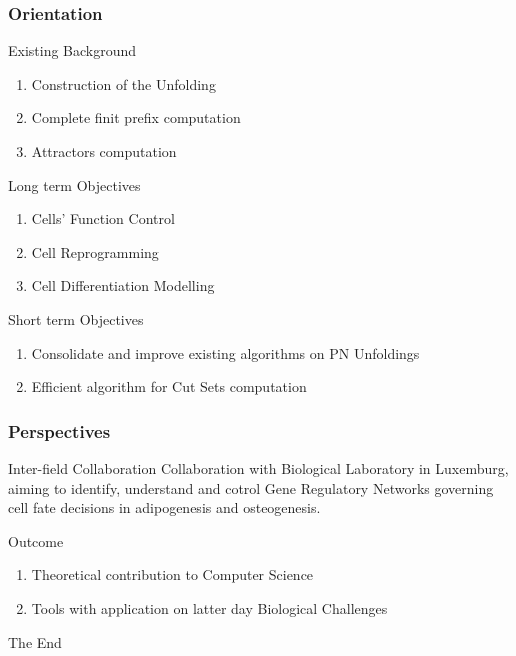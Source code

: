 \documentclass{beamer}
\begin{document}
\begin{frame}
\frametitle{Orientation}

\begin{block}{Existing Background}
\begin{enumerate}
\item Construction of the Unfolding
\item Complete finit prefix computation
\item Attractors computation
\end{enumerate}
\end{block}

\begin{block}{Long term Objectives}
\begin{enumerate}
\item Cells' Function Control 
\item Cell Reprogramming
\item Cell Differentiation Modelling 
\end{enumerate}
\end{block}

\begin{block}{Short term Objectives}
\begin{enumerate}
\item Consolidate and improve existing algorithms on PN Unfoldings 
\item \alert{Efficient algorithm for Cut Sets computation}
\end{enumerate}
\end{block}

\end{frame}


\begin{frame}
\frametitle{Perspectives}
\begin{block}{Inter-field Collaboration}
Collaboration with Biological Laboratory in Luxemburg, aiming to identify, understand and cotrol Gene Regulatory Networks governing cell fate decisions in adipogenesis and osteogenesis.
\end{block}
\begin{block}{Outcome}
\begin{enumerate}
\item Theoretical contribution to Computer Science
\item Tools with application on latter day Biological Challenges
\end{enumerate}
\end{block}
\end{frame}
\begin{frame}
\Huge{\centerline{The End}}
\end{frame}

\end{document}
